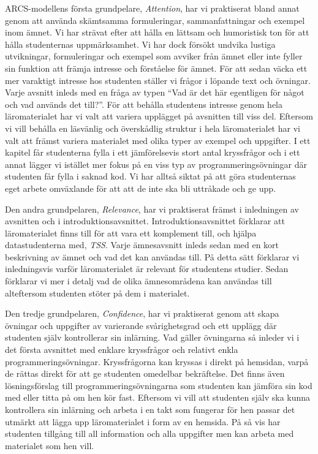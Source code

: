 \documentclass[12pt,a4paper,twoside,openright]{article}
\begin{document}
ARCS-modellens första grundpelare, \textit{Attention}, har vi
praktiserat bland annat genom att använda skämtsamma formuleringar,
sammanfattningar och exempel inom ämnet. Vi har strävat efter att
hålla en lättsam och humoristisk ton för att hålla studenternas
uppmärksamhet. Vi har dock försökt undvika lustiga utvikningar,
formuleringar och exempel som avviker från ämnet eller inte fyller sin
funktion att främja intresse och förståelse för ämnet. För att sedan
väcka ett mer varaktigt intresse hos studenten ställer vi frågor i
löpande text och övningar. Varje avsnitt inleds med en fråga av typen
“Vad är det här egentligen för något och vad används det till?”. För
att behålla studentens intresse genom hela läromaterialet har vi valt
att variera upplägget på avsnitten till viss del. Eftersom vi vill
behålla en läsvänlig och överskådlig struktur i hela läromaterialet
har vi valt att främst variera materialet med olika typer av exempel
och uppgifter. I ett kapitel får studenterna fylla i ett jämförelsevis
stort antal kryssfrågor och i ett annat lägger vi istället mer fokus på en
viss typ av programmeringsövningar där studenten får fylla i saknad
kod. Vi har alltså siktat på att göra studenternas eget arbete
omväxlande för att att de inte ska bli uttråkade och ge upp.

Den andra grundpelaren, \textit{Relevance}, har vi praktiserat främst
i inledningen av avsnitten och i
introduktionsavsnittet. Introduktionsavsnittet förklarar att
läromaterialet finns till för att vara ett komplement till, och hjälpa
datastudenterna med, \textit{TSS}. Varje ämnesavsnitt inleds sedan med
en kort beskrivning av ämnet och vad det kan användas till. På detta
sätt förklarar vi inledningsvis varför läromaterialet är relevant för
studentens studier. Sedan förklarar vi mer i detalj vad de olika
ämnesområdena kan användas till alteftersom studenten stöter på dem i
materialet.

Den tredje grundpelaren, \textit{Confidence}, har vi praktiserat genom
att skapa övningar och uppgifter av varierande svårighetsgrad och ett
upplägg där studenten själv kontrollerar sin inlärning. Vad gäller
övningarna så inleder vi i det första avsnittet med enklare
kryssfrågor och relativt enkla programmeringsövningar. Kryssfrågorna
kan kryssas i direkt på hemsidan, varpå de rättas direkt för att ge
studenten omedelbar bekräftelse. Det finns även lösningsförslag till
programmeringsövningarna som studenten kan jämföra sin kod med eller
titta på om hen kör fast. Eftersom vi vill att studenten själv ska
kunna kontrollera sin inlärning och arbeta i en takt som fungerar för
hen passar det utmärkt att lägga upp läromaterialet i form av en
hemsida. På så vis har studenten tillgång till all information och
alla uppgifter men kan arbeta med materialet som hen vill.
\end{document}
